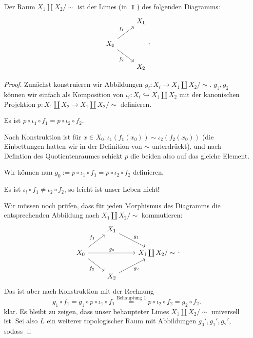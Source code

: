 \begin{trivial*}
    Der Raum $X_1 \coprod X_2 / \sim $ ist der Limes (in $\Top$) des folgenden Diagramms:
    \[
    \begin{tikzcd}
        & X_1 \\
        X_0 \ar{ur}{f_1} \ar[swap]{dr}{f_2}\\
        & X_2
    \end{tikzcd}
    .\] 
    \begin{proof}
        Zunächst konstruieren wir Abbildungen $g_i : X_i \to  X_1\coprod X_2 / \sim $. $g_1,g_2$ können wir einfach als Komposition von $ι_i: X_i \hookrightarrow X_1\coprod X_2$ mit der kanonischen Projektion $p : X_1 \coprod X_2 \to  X_1 \coprod X_2 / \sim $ definieren.
        \begin{claim}
            Es ist $p \circ  ι_1 \circ  f_1 =  p \circ  ι_2 \circ  f_2$.
        \end{claim}
        \begin{subproof}
            Nach Konstruktion ist für $x\in X_0\colon ι_1(f_1(x_0)) \sim ι_2(f_2(x_0))$ (die Einbettungen hatten wir in der Definition von  $\sim $ unterdrückt), und nach Defintion des Quotientenraumes schickt $p$ die beiden also auf das gleiche Element.
        \end{subproof}
        Wir können nun $g_0 := p \circ  ι_1 \circ  f_1 = p \circ  ι_2 \circ  f_2$ definieren.
        \begin{warning}
            Es ist $ι_i \circ  f_1 \neq  ι_2 \circ  f_2$, so leicht ist unser Leben nicht!
        \end{warning}
        Wir müssen noch prüfen, dass für jeden Morphismus des Diagramms die entsprechenden Abbildung nach  $X_1 \coprod X_2 / \sim $ kommutieren:
        \[
        \begin{tikzcd}
        & X_1 \ar{dr}{g_1}\\
            X_0 \ar{ur}{f_1} \ar[swap]{dr}{f_2} \ar{rr}{g_0} & & X_1 \coprod X_2 / \sim \\
                                                             & X_2 \ar[swap]{ur}{g_2}
        \end{tikzcd}
        .\] 
        Das ist aber nach Konstruktion mit der Rechnung
        \[
            g_1 \circ  f_1 = g_1 \circ  p \circ  ι_1 \circ  f_1 \stackrel{\text{Behauptung 1}}{=} p \circ  ι_2 \circ  f_2 = g_2 \circ  f_2
        .\] 
        klar. Es bleibt zu zeigen, dass unser behaupteter Limes $X_1 \coprod X_2 / \sim $ universell ist. Sei also $L$ ein weiterer topologischer Raum mit Abbildungen  $g_0',g_1',g_2'$, sodass 

\end{proof}
\end{trivial*}
